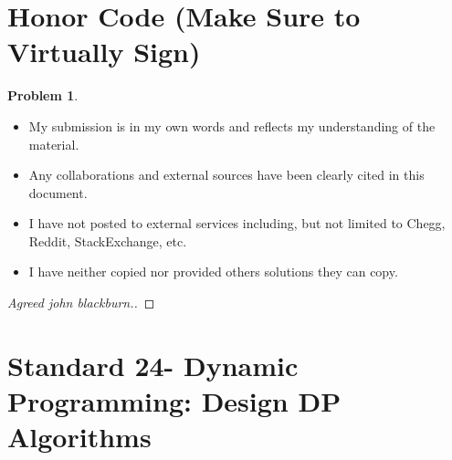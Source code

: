 \documentclass[11pt]{article}
\theoremstyle{definition}
\theoremstyle{definition}
\newtheorem{required}{Problem}
\theoremstyle{definition}
\begin{document}
\section{Honor Code (Make Sure to Virtually Sign)} \label{HonorCode}

\begin{required}
\begin{itemize}
\item My submission is in my own words and reflects my understanding of the material.
\item Any collaborations and external sources have been clearly cited in this document.
\item I have not posted to external services including, but not limited to Chegg, Reddit, StackExchange, etc.
\item I have neither copied nor provided others solutions they can copy.
\end{itemize}

\end{required}

\begin{proof}[Agreed john blackburn.]
\end{proof}


\newpage
\section{Standard 24- Dynamic Programming: Design DP Algorithms}
\end{document}

